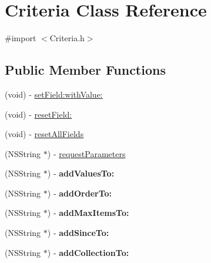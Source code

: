 \hypertarget{interface_criteria}{
\section{Criteria Class Reference}
\label{interface_criteria}
}


{\ttfamily \#import $<$Criteria.h$>$}

\subsection*{Public Member Functions}
\begin{DoxyCompactItemize}
\item 
(void) -\/ \hyperlink{interface_criteria_a1afe868a36269a5e59538a860df0f635}{setField:withValue:}
\item 
(void) -\/ \hyperlink{interface_criteria_ae40b2aab089ce071f0a65c2c304323e9}{resetField:}
\item 
(void) -\/ \hyperlink{interface_criteria_af045a3a1a4dc50fa8b50daa15d206f0d}{resetAllFields}
\item 
(NSString $\ast$) -\/ \hyperlink{interface_criteria_a68d80bcd8c9abb4793c3bd28451ea3af}{requestParameters}
\item 
\hypertarget{interface_criteria_af3a2812286917a5d4654a16df527982e}{
(NSString $\ast$) -\/ {\bfseries addValuesTo:}}
\label{interface_criteria_af3a2812286917a5d4654a16df527982e}

\item 
\hypertarget{interface_criteria_a1f269d4cd89ecfb7999076134a1fd096}{
(NSString $\ast$) -\/ {\bfseries addOrderTo:}}
\label{interface_criteria_a1f269d4cd89ecfb7999076134a1fd096}

\item 
\hypertarget{interface_criteria_a7a2f966ad0c12e76c58aa44017e8ed32}{
(NSString $\ast$) -\/ {\bfseries addMaxItemsTo:}}
\label{interface_criteria_a7a2f966ad0c12e76c58aa44017e8ed32}

\item 
\hypertarget{interface_criteria_a32c6b3308cc89690b1a3334137e68e80}{
(NSString $\ast$) -\/ {\bfseries addSinceTo:}}
\label{interface_criteria_a32c6b3308cc89690b1a3334137e68e80}

\item 
\hypertarget{interface_criteria_aa145b4293955034eb83436d57f07c73e}{
(NSString $\ast$) -\/ {\bfseries addCollectionTo:}}
\label{interface_criteria_aa145b4293955034eb83436d57f07c73e}

\end{DoxyCompactItemize}
